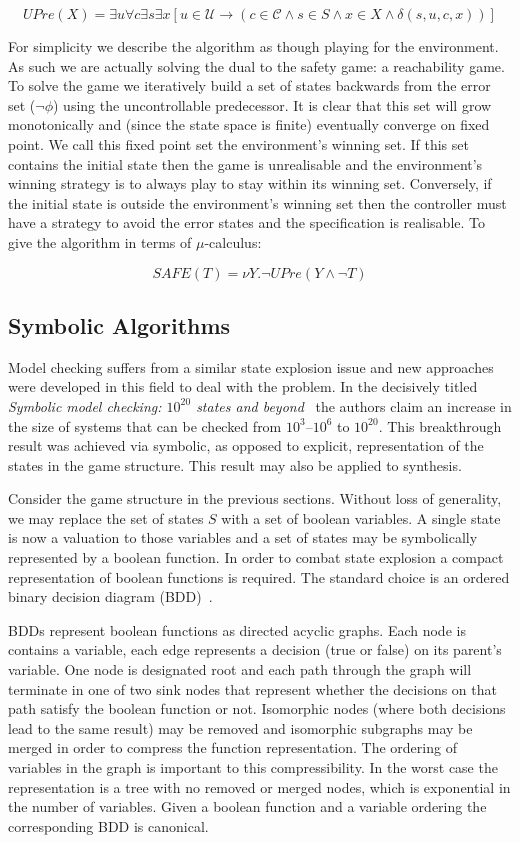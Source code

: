 $$UPre(X) = \exists u \forall c \exists s \exists x [u \in \mathcal{U} \to (c \in \mathcal{C} \land s \in S \land x \in X \land \delta(s, u, c, x))]$$

For simplicity we describe the algorithm as though playing for the environment. As such we are actually solving the dual to the safety game: a reachability game.  To solve the game we iteratively build a set of states backwards from the error set ($\lnot \phi$) using the uncontrollable predecessor. It is clear that this set will grow monotonically and (since the state space is finite) eventually converge on fixed point. We call this fixed point set the environment's winning set. If this set contains the initial state then the game is unrealisable and the environment's winning strategy is to always play to stay within its winning set. Conversely, if the initial state is outside the environment's winning set then the controller must have a strategy to avoid the error states and the specification is realisable. To give the algorithm in terms of $\mu$-calculus:

$$ SAFE(T) = \nu Y . \lnot UPre( Y \land \lnot T ) $$

\subsection{Symbolic Algorithms}

Model checking suffers from a similar state explosion issue and new approaches were developed in this field to deal with the problem.  In the decisively titled \emph{Symbolic model checking: $10^{20}$ states and beyond}~\cite{Burch90} the authors claim an increase in the size of systems that can be checked from $10^3$--$10^6$ to $10^{20}$. This breakthrough result was achieved via symbolic, as opposed to explicit, representation of the states in the game structure. This result may also be applied to synthesis.

Consider the game structure in the previous sections. Without loss of generality, we may replace the set of states $S$ with a set of boolean variables. A single state is now a valuation to those variables and a set of states may be symbolically represented by a boolean function. In order to combat state explosion a compact representation of boolean functions is required. The standard choice is an ordered binary decision diagram (BDD)~\cite{Bryant86}.

BDDs represent boolean functions as directed acyclic graphs. Each node is contains a variable, each edge represents a decision (true or false) on its parent's variable. One node is designated root and each path through the graph will terminate in one of two sink nodes that represent whether the decisions on that path satisfy the boolean function or not. Isomorphic nodes (where both decisions lead to the same result) may be removed and isomorphic subgraphs may be merged in order to compress the function representation. The ordering of variables in the graph is important to this compressibility. In the worst case the representation is a tree with no removed or merged nodes, which is exponential in the number of variables. Given a boolean function and a variable ordering the corresponding BDD is canonical.

